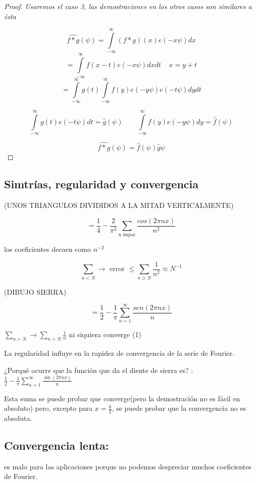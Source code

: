 \begin{proof}
	\textit{Usaremos el caso 3, las demostraciones en los otros casos son similares a ésta}

$$ \hat{f*g}(\psi) = \int\limits^{\infty}_{-\infty} (f*g)(x) e(-x\psi)dx $$
$$ = \int\limits^{\infty}_{-\infty} f(x - t) e (-x \psi) dx dt \;\;\;\; x = y + t$$
$$ = \int\limits^{\infty}_{-\infty} g(t) \int\limits^{\infty}_{-\infty} f(y) e (-y \psi) e(-t\psi)dy dt$$

$$ \int\limits^{\infty}_{-\infty} g(t) e(-t\psi) dt = \hat{g}(\psi) \;\;\;\;\;\;\; \int\limits^{\infty}_{-\infty} f(y) e (-y \psi) dy = \hat{f}(\psi) $$

$$\hat{f*g} (\psi) = \hat{f}(\psi) \hat{g}\psi $$

\end{proof}



\subsection{Simtrías, regularidad y convergencia}


(UNOS TRIANGULOS DIVIDIDOS A LA MITAD VERTICALMENTE)

$$ = \frac{1}{4} - \frac{2}{\pi^2} \sum_{\text{n impar}} \frac{cos(2 \pi n x)}{n^2}$$

los coeficientes decaen como $n^{-2}$

$$ \sum_{n < N} \rightarrow \text{ error } \leq \sum_{n \geq N} \frac{1}{n^2}  ≈ N^{-1} $$



(DIBUJO SIERRA)  

$$ = \frac{1}{2} - \frac{1}{\pi} \sum^{\infty}_{n = 1} \frac{sen(2 \pi n x)}{n}$$

$ \sum_{n > N} \rightarrow \sum_{n > N} \frac{1}{n}$ ni siquiera converge (1)

La regularidad influye en la rapidez de convergencia de la serie de Fourier.




¿Porqué ocurre que la función que da el diente de sierra es? : $\frac{1}{2} - \frac{1}{\pi} \sum_{n=1}^{\infty} \frac{\sin(2\pi nx)}{n}$
	
Esta suma se puede probar que converge(pero la demostración no es fácil en absoluto) pero, excepto para $x = \frac{k}{2}$, se puede probar que la convergencia no es absoluta.

\subsection{Convergencia lenta:} es malo para las aplicaciones porque no podemos despreciar muchos coeficientes de Fourier.
	
